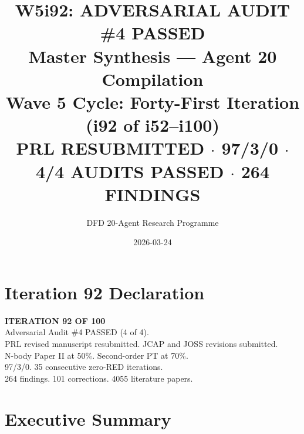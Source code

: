 \documentclass[11pt,a4paper]{article}
\title{\Huge W5i92: ADVERSARIAL AUDIT \#4 PASSED\\[12pt]
\Large Master Synthesis --- Agent 20 Compilation\\[6pt]
\large Wave 5 Cycle: Forty-First Iteration (i92 of i52--i100)\\[6pt]
\normalsize \textbf{PRL RESUBMITTED} $\cdot$ 97/3/0 $\cdot$ 4/4 AUDITS PASSED $\cdot$ 264 FINDINGS}
\author{DFD 20-Agent Research Programme}
\date{2026-03-24}
\begin{document}
\maketitle

\section*{Iteration 92 Declaration}

\begin{tcolorbox}[colback=green!5!white, colframe=dfdgreen]
\begin{center}
\Large\textbf{ITERATION 92 OF 100}\\[6pt]
\large Adversarial Audit \#4 PASSED (4 of 4).\\
PRL revised manuscript resubmitted. JCAP and JOSS revisions submitted.\\
N-body Paper II at 50\%. Second-order PT at 70\%.\\[6pt]
\normalsize 97/3/0. 35 consecutive zero-RED iterations.\\
264 findings. 101 corrections. 4055 literature papers.
\end{center}
\end{tcolorbox}

\section{Executive Summary}
\end{document}
